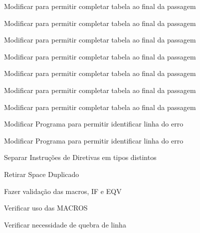 
\begin{DoxyRefList}
\item[\label{todo__todo000001}%
\hypertarget{todo__todo000001}{}%
Membro \hyperlink{assembler_8h_a368a4f7b83093ab74e79be4ceeb11e3d}{assembler} (int argc, char $\ast$argv\mbox{[}\mbox{]})]Modificar para permitir completar tabela ao final da passagem 

Modificar para permitir completar tabela ao final da passagem 

Modificar para permitir completar tabela ao final da passagem 

Modificar para permitir completar tabela ao final da passagem 

Modificar para permitir completar tabela ao final da passagem 

Modificar para permitir completar tabela ao final da passagem 

Modificar para permitir completar tabela ao final da passagem 

Modificar Programa para permitir identificar linha do erro 

Modificar Programa para permitir identificar linha do erro  
\item[\label{todo__todo000010}%
\hypertarget{todo__todo000010}{}%
Membro \hyperlink{languagedefinition_8h_a1830ff5737e4f1610e975ee2aa489206}{Instruction\-Code} ]Separar Instruções de Diretivas em tipos distintos 

Retirar Space Duplicado  
\item[\label{todo__todo000011}%
\hypertarget{todo__todo000011}{}%
Membro \hyperlink{macroeval_8h_ab726e2a9f26698bddb5ddd13683e6630}{macroeval} (int argc, char $\ast$$\ast$argv)]Fazer validação das macros, I\-F e E\-Q\-V 

Verificar uso das M\-A\-C\-R\-O\-S 

Verificar necessidade de quebra de linha 
\end{DoxyRefList}